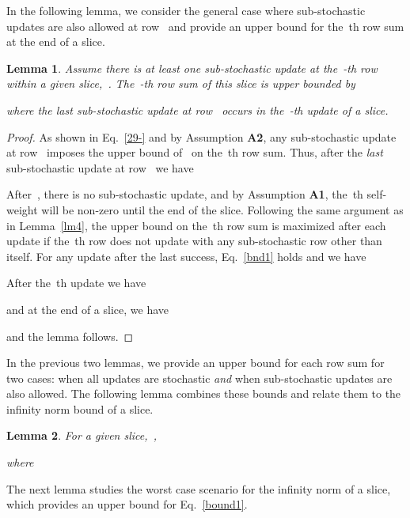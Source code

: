 \documentclass[draftclsnofoot, onecolumn, 12pt]{IEEEtran}
\newtheorem{lem}{Lemma}
\begin{document}
In the following lemma, we consider the general case where sub-stochastic updates are also allowed at row~ and provide an upper bound for the~th row sum at the end of a slice.
\begin{lem}\label{lm5}
Assume there is at least one sub-stochastic update at the~-th row within a given slice,~. The~-th row sum of this slice is upper bounded by

where the last sub-stochastic update at row~ occurs in the~-th update of a slice.
\end{lem}
\begin{proof}
As shown in Eq.~\eqref{29-} and by Assumption {\bf A2}, any sub-stochastic update at row~ imposes the upper bound of~ on the~th row sum.
Thus, after the \textit{last} sub-stochastic update at row~ we have

After~, there is no sub-stochastic update, and by Assumption {\bf{A1}}, the~th self-weight will be non-zero until the end of the slice. Following the same argument as in Lemma~\ref{lm4}, the upper bound on the~th row sum is maximized after each update if the~th row does not update with any  sub-stochastic row other than itself. For any update after the last success, Eq.~\eqref{bnd1} holds and we have
 
After the~th update we have

and at the end of a slice, we have

and the lemma follows.
\end{proof}

In the previous two lemmas, we provide an upper bound for each row sum for two cases: when all updates are stochastic \emph{and} when sub-stochastic updates are also allowed. The following lemma combines these bounds and relate them to the infinity norm bound of a slice.

\begin{lem}
For a given slice,~, 

where

\end{lem}

\noindent The next lemma studies the worst case scenario for the infinity norm of a slice, which provides an upper bound for Eq.~\eqref{bound1}.
\end{document}
